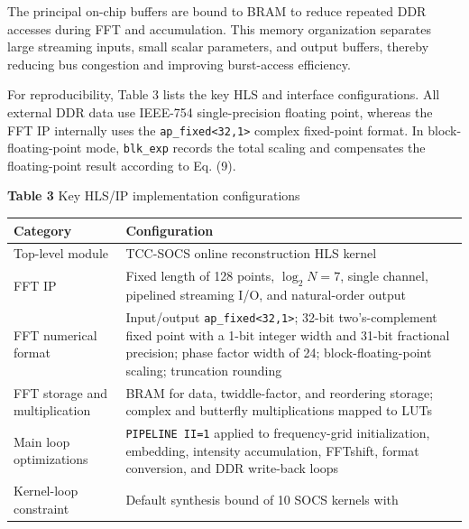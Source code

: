 \documentclass[
  preprint]{elsarticle}
\newcounter{none} %
\begin{document}
The principal on-chip buffers are bound to BRAM to reduce repeated DDR
accesses during FFT and accumulation. This memory organization separates
large streaming inputs, small scalar parameters, and output buffers,
thereby reducing bus congestion and improving burst-access efficiency.

For reproducibility, Table 3 lists the key HLS and interface
configurations. All external DDR data use IEEE-754 single-precision
floating point, whereas the FFT IP internally uses the
\texttt{ap\_fixed\textless{}32,1\textgreater{}} complex fixed-point
format. In block-floating-point mode, \texttt{blk\_exp} records the
total scaling and compensates the floating-point result according to Eq.
(9).

\textbf{Table 3} Key HLS/IP implementation configurations

{\def\LTcaptype{none} %
\begin{longtable}[]{@{}
  >{\raggedright\arraybackslash}p{}
  >{\raggedright\arraybackslash}p{}@{}}
\toprule\noalign{}
\begin{minipage}[b]{\linewidth}\raggedright
Category
\end{minipage} & \begin{minipage}[b]{\linewidth}\raggedright
Configuration
\end{minipage} \\
\midrule\noalign{}
\endhead
\bottomrule\noalign{}
\endlastfoot
Top-level module & TCC-SOCS online reconstruction HLS kernel \\
FFT IP & Fixed length of 128 points, \(\log_2 N=7\), single channel,
pipelined streaming I/O, and natural-order output \\
FFT numerical format & Input/output
\texttt{ap\_fixed\textless{}32,1\textgreater{}}; 32-bit two's-complement
fixed point with a 1-bit integer width and 31-bit fractional precision;
phase factor width of 24; block-floating-point scaling; truncation
rounding \\
FFT storage and multiplication & BRAM for data, twiddle-factor, and
reordering storage; complex and butterfly multiplications mapped to
LUTs \\
Main loop optimizations & \texttt{PIPELINE\ II=1} applied to
frequency-grid initialization, embedding, intensity accumulation,
FFTshift, format conversion, and DDR write-back loops \\
Kernel-loop constraint & Default synthesis bound of 10 SOCS kernels with

\end{longtable}}
\end{document}
